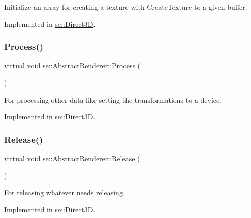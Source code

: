 Initialize an array for creating a texture with Create\+Texture to a given buffer. 

Implemented in \mbox{\hyperlink{classse_1_1_direct3_d_a7d5db09c1cf0c5c45f61c631b174fcf2}{se\+::\+Direct3D}}.

\mbox{\label{classse_1_1_abstract_renderer_a90596b2d067b4fa197b809191407be97}} 
\subsubsection{\texorpdfstring{Process()}{Process()}}
{\footnotesize\ttfamily virtual void se\+::\+Abstract\+Renderer\+::\+Process (\begin{DoxyParamCaption}{ }\end{DoxyParamCaption})\hspace{0.3cm}{\ttfamily [pure virtual]}}

For processing other data like setting the transformations to a device. 

Implemented in \mbox{\hyperlink{classse_1_1_direct3_d_aa87e49a2704cc5da20655ce41ae9782b}{se\+::\+Direct3D}}.

\mbox{\label{classse_1_1_abstract_renderer_a98e35b7db62827580573185ed91b25bb}} 
\subsubsection{\texorpdfstring{Release()}{Release()}\hspace{0.1cm}{\footnotesize\ttfamily [1/2]}}
{\footnotesize\ttfamily virtual void se\+::\+Abstract\+Renderer\+::\+Release (\begin{DoxyParamCaption}{ }\end{DoxyParamCaption})\hspace{0.3cm}{\ttfamily [pure virtual]}}

For releasing whatever needs releasing. 

Implemented in \mbox{\hyperlink{classse_1_1_direct3_d_ae2979f16a5c35773cf2c243d8e6f90e4}{se\+::\+Direct3D}}.

\mbox{\label{classse_1_1_abstract_renderer_af6d6d012f070f95d4c49713002872fcc}} 
